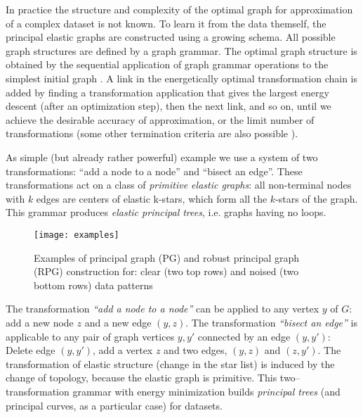 \documentclass[graybox]{archivesofdatascience}
\begin{document}
In practice the structure and complexity of the optimal graph for
approximation of a complex dataset is not known.
To learn it from the data themself, the principal elastic graphs
are constructed using a growing schema. All possible graph
structures are defined by a graph grammar. The optimal graph structure is obtained by the sequential application
of graph grammar operations to
the simplest initial graph \citep{gorban2007topological}. A link in the energetically optimal transformation chain is
added by finding a transformation application that gives the
largest energy descent (after an optimization step), then the next
link, and so on, until we achieve the desirable accuracy of
approximation, or the limit number of transformations (some other
termination criteria are also possible \citep{zinovyev2013data}).

\iffalse
The selection of an
energetically optimal application of transformations by the trial
optimization steps is time-consuming. There exist alternative
approaches. The preselection of applications for a production rule
$A \to B$ can be done through comparison of energy of copies of $A$
with its incident edges and stars in the transformed graph $G$.
\fi

As simple (but already rather powerful) example  we use a system
of two transformations: ``add a node to a node'' and ``bisect an
edge''. These transformations act on a class of {\it primitive
elastic graphs}:  all non-terminal nodes with $k$ edges are centers
of elastic k-stars, which form all the $k$-stars of the graph. This grammar
produces {\it elastic principal trees}, i.e. graphs having no loops.

\begin{figure}[tbp]
\texttt{[image: examples]}
\caption{Examples of principal graph (PG) and robust principal graph (RPG) construction for: clear (two top rows) and noised (two bottom rows) data patterns}
\label{GORBANEXAMPLE}       \end{figure}

\iffalse

The transformation {\it ``add a node to a node''} can be applied to any vertex
$y$ of $G$:  add a new node $z$ and a new edge $(y,z)$. The
transformation {\it ``bisect an edge''} is applicable to any pair of
graph vertices $y,y'$ connected by an edge $(y,y')$: Delete edge
$(y,y')$, add a vertex $z$ and two edges, $(y,z)$ and $(z,y')$. The
transformation of elastic structure (change in the star list) is
induced by the change of topology, because the elastic graph is
primitive. This two--transformation grammar with energy minimization
builds {\it principal trees} (and principal curves, as a particular
case) for datasets.
\end{document}

